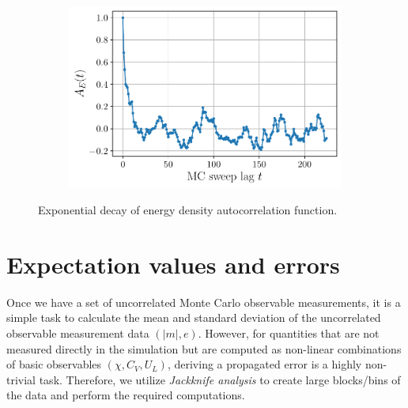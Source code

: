 \documentclass[../journal_main.tex]{subfiles}
\begin{document}
\begin{figure}[!htb]
    \centering
    \begin{subfigure}[b]{0.55\textwidth}  %
        \centering
        \includegraphics[width=\textwidth]{images/monte_carlo/autocorrfn.pdf}
    \end{subfigure}
    \caption{Exponential decay of energy density autocorrelation function.}
    \label{}
\end{figure}
\section{Expectation values and errors}
Once we have a set of uncorrelated Monte Carlo observable measurements, it is a simple task to calculate the mean and standard deviation of the uncorrelated observable measurement data $(|m|, e)$. However, for quantities that are not measured directly in the simulation but are computed as non-linear combinations of basic observables $(\chi, C_V, U_L)$, deriving a propagated error is a highly non-trivial task. Therefore, we utilize \textit{Jackknife analysis} to create large blocks/bins of the data and perform the required computations.
\end{document}

